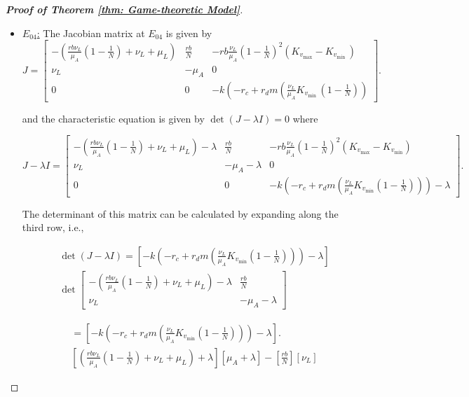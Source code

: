 \documentclass{article}
\theoremstyle{remark}
\theoremstyle{custom} %
\begin{document}
\begin{proof}[\textbf{Proof of Theorem \ref{thm: Game-theoretic Model}}]
\begin{itemize}
\item \underline{$E_{04}$:} The Jacobian matrix at $E_{04}$ is given by 
 $$
J=\left[\begin{array}{ccc}
-\left(\frac{r b \nu_L}{\mu_A}\left(1-\frac{1}{{N}}\right)+\nu_L+\mu_L\right) & \frac{r b}{{N}} & -r b \frac{\nu_L}{\mu_A}\left(1-\frac{1}{{N}}\right)^2\left(K_{v_{\max }}-K_{v_{\text {min }}}\right) \\
\nu_L & -\mu_A & 0 \\
0 & 0 & -k\left(-r_c+r_d m\left(\frac{\nu_L}{\mu_A} K_{v_{\text {min }}}\left(1-\frac{1}{{N}}\right)\right)\right.
\end{array}\right].
$$

and the characteristic equation is given by \(\det(J - \lambda I) = 0\) where

\[
J-\lambda I = \left[
\begin{array}{ccc}
-\left(\frac{r b \nu_L}{\mu_A}\left(1 - \frac{1}{{N}}\right) + \nu_L + \mu_L\right) - \lambda 
& \frac{r b}{{N}} 
& -r b \frac{\nu_L}{\mu_A}\left(1 - \frac{1}{{N}}\right)^2\left(K_{v_{\max}} - K_{v_{\min}}\right) \\
\nu_L 
& -\mu_A - \lambda 
& 0 \\
0 
& 0 
& -k\left(-r_c + r_d m \left(\frac{\nu_L}{\mu_A} K_{v_{\min}}\left(1 - \frac{1}{{N}}\right)\right)\right) - \lambda
\end{array}
\right].
\]

The determinant of this matrix can be calculated by expanding along the third row, i.e.,

$$
\begin{aligned}
& \operatorname{det}(J-\lambda I)=\left[-k\left(-r_c+r_d m\left(\frac{\nu_L}{\mu_A} K_{v_{\min }}\left(1-\frac{1}{{N}}\right)\right)\right)-\lambda\right] \\
& \operatorname{det}\left[\begin{array}{cc}
-\left(\frac{r b \nu_L}{\mu_A}\left(1-\frac{1}{{N}}\right)+\nu_L+\mu_L\right)-\lambda & \frac{r b}{{N}} \\
\nu_L & -\mu_A-\lambda
\end{array}\right]
\end{aligned}
$$

$$ 
\begin{aligned}
&=\left[-k\left(-r_c+r_d m\left(\frac{\nu_L}{\mu_A} K_{v_{\min }}\left(1-\frac{1}{{N}}\right)\right)\right)-\lambda\right]. \\
& {\left[\left(\frac{r b \nu_L}{\mu_A}\left(1-\frac{1}{{N}}\right)+\nu_L+\mu_L\right)+\lambda\right]\left[\mu_A+\lambda\right]-\left[\frac{r b}{{N}}\right]\left[\nu_L\right] }
\end{aligned}
$$


\end{itemize}
\end{proof}
\end{document}
